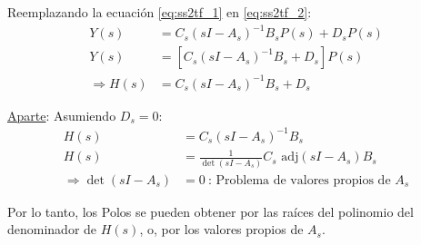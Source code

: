 Reemplazando la ecuación \ref{eq:ss2tf_1} en \ref{eq:ss2tf_2}:
\begin{align*}
    {Y}(s)&={C_s}(s{I}-{A_s})^{-1}{B_s}{P}(s)+{D_s}{P}(s)\\
    {Y}(s)&=[{C_s}(s{I}-{A_s})^{-1}{B_s}+{D_s}]{P}(s)\\
    \Longrightarrow {H}(s)&={C_s}(s{I}-{A_s})^{-1}{B_s}+{D_s}
\end{align*}

\underline{Aparte}: Asumiendo ${D_s}=0$:
\begin{align*}
    {H}(s)&={C_s}(s{I}-{A_s})^{-1}{B_s}\\
    {H}(s)&=\frac{1}{\det(s{I}-{A_s})}{C_s}\text{ adj}(s{I}-{A_s}){B_s} \\
    \Longrightarrow\det(s{I}-{A_s})&=0 ~\text{: Problema de valores propios de }{A_s}
\end{align*}

Por lo tanto, los Polos se pueden obtener por las raíces del polinomio del denominador de ${H}(s)$, o, por los valores propios de ${A_s}$.







